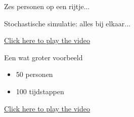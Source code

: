 \documentclass[aspectratio=169,xcolor=dvipsnames]{beamer}
\begin{document}
\begin{frame}{Zes personen op een rijtje...}
\end{frame}



   
\begin{frame}{Stochastische simulatie: alles bij elkaar...}

 \href{run:smallexample.mp4}{Click here to play the video}
	
\end{frame}


\begin{frame}{Een wat groter voorbeeld}
\begin{itemize}
	\item 50 personen
	\item 100 tijdstappen
\end{itemize}	



 \href{run:large_example.mp4}{Click here to play the video}
\end{frame}
\end{document}
